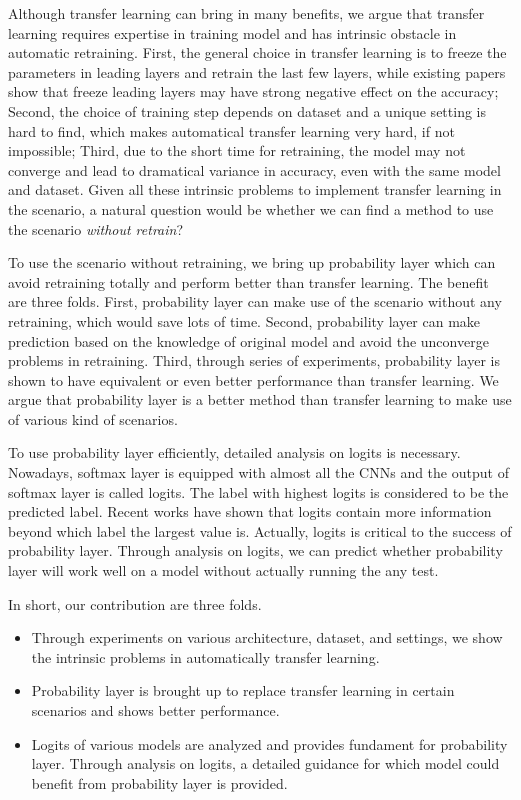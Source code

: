 \documentclass{article}
\begin{document}
Although transfer learning can bring in many benefits, we argue that transfer learning requires expertise in training model and has intrinsic obstacle in automatic retraining. First, the general choice in transfer learning is to freeze the parameters in leading layers and retrain the last few layers, while existing papers show that freeze leading layers may have strong negative effect on the accuracy; Second, the choice of training step depends on dataset and a unique setting is hard to find, which makes automatical transfer learning very hard, if not impossible; Third, due to the short time for retraining, the model may not converge and lead to dramatical variance in accuracy, even with the same model and dataset. Given all these intrinsic problems to implement transfer learning in the scenario, a natural question would be whether we can find a method to use the scenario \textit{without retrain}?

To use the scenario without retraining, we bring up probability layer which can avoid retraining totally and perform better than transfer learning. The benefit are three folds. First, probability layer can make use of the scenario without any retraining, which would save lots of time. Second, probability layer can make prediction based on the knowledge of original model and avoid the unconverge problems in retraining. Third, through series of experiments, probability layer is shown to have equivalent or even better performance than transfer learning. We argue that probability layer is a better method than transfer learning to make use of various kind of scenarios.

To use probability layer efficiently, detailed analysis on logits is necessary. Nowadays, softmax layer is equipped with almost all the CNNs and the output of softmax layer is called logits. The label with highest logits is considered to be the predicted label. Recent works have shown that logits contain more information beyond which label the largest value is. Actually, logits is critical to the success of probability layer. Through analysis on logits, we can predict whether probability layer will work well on a model without actually running the any test.

In short, our contribution are three folds.
\begin{itemize}
    \item Through experiments on various architecture, dataset, and settings, we show the intrinsic problems in automatically transfer learning.
    \item Probability layer is brought up to replace transfer learning in certain scenarios and shows better performance.
    \item Logits of various models are analyzed and provides fundament for probability layer. Through analysis on logits, a detailed guidance for which model could benefit from probability layer is provided.
\end{itemize}
\end{document}
